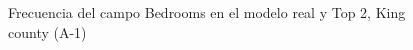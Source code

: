 \begin{figure}[H]
    \centering
    
    \caption{Frecuencia del campo Bedrooms en el modelo real y Top 2, King county (A-1)}
    \label{frecuency-top2-bedrooms}
\end{figure}